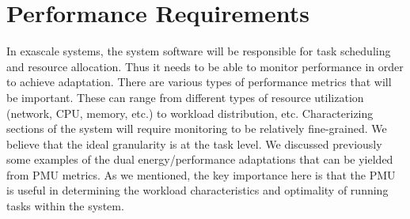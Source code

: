 



\section{Performance Requirements}
    In exascale systems, the system software will be responsible for task scheduling and resource allocation. Thus it needs to be able to monitor performance in order to achieve adaptation. There are various types of performance metrics that will be important. These can range from different types of resource utilization (network, CPU, memory, etc.) to workload distribution, etc. Characterizing sections of the system will require monitoring to be relatively fine-grained. We believe that the ideal granularity is at the task level. We discussed previously some examples of the dual energy/performance adaptations that can be yielded from PMU metrics. As we mentioned, the key importance here is that the PMU is useful in determining the workload characteristics and optimality of running tasks within the system.



